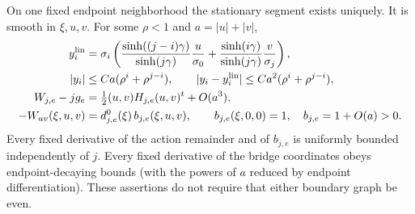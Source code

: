 \begin{lemma}
\label{lem:g-relative}
On one fixed endpoint neighborhood the stationary segment exists uniquely.
It is smooth in $\xi,u,v$. For some $\rho<1$ and $a=|u|+|v|$,
\begin{align}\label{eq:g-bridge}
 y_i^{\rm lin}&=\sigma_i\left(
 \frac{\sinh((j-i)\gamma)}{\sinh(j\gamma)}\frac u{\sigma_0}
 +\frac{\sinh(i\gamma)}{\sinh(j\gamma)}\frac v{\sigma_j}\right),\\
 |y_i|&\le Ca(\rho^i+\rho^{j-i}),\qquad
 |y_i-y_i^{\rm lin}|\le Ca^2(\rho^i+\rho^{j-i}),\notag\\
 W_{j,e}-jg_e&=\tfrac12(u,v)H_{j,e}(u,v)^t+O(a^3),\notag\\
 -W_{uv}(\xi,u,v)&=d^0_{j,e}(\xi)\,b_{j,e}(\xi,u,v),\qquad
 b_{j,e}(\xi,0,0)=1,\quad b_{j,e}=1+O(a)>0.\label{eq:g-relative}
\end{align}
Every fixed derivative of the action remainder and of $b_{j,e}$ is
uniformly bounded independently of $j$. Every fixed derivative of the
bridge coordinates obeys endpoint-decaying bounds (with the powers of
$a$ reduced by endpoint differentiation). These assertions do not require
that either boundary graph be even.
\end{lemma}
